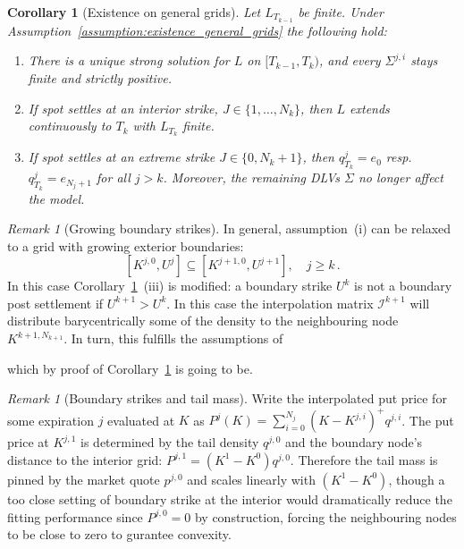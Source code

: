 \documentclass[11pt]{article}
\theoremstyle{plain}
\newtheorem{corollary}[theorem]{Corollary}
\theoremstyle{definition}
\theoremstyle{remark}
\newtheorem{remark}[theorem]{Remark}
\begin{document}
\begin{corollary}[Existence on general grids]
  \label{thm:existence_general_grids}
  Let $L_{T_{k-1}} $ be finite. Under Assumption~\ref{assumption:existence_general_grids} the following hold: 
  \begin{enumerate}[label=(\roman*)]
  \item There is a unique strong solution for $L$ on $[T_{k-1},T_k)$, and every $\Sigma^{j,i}$ stays
    finite and strictly positive.
  \item If spot settles at an interior strike, $ J \in \lbrace 1, \dots, N_k \rbrace $, then $L$ extends continuously to $T_k$
    with $L_{T_k}$ finite.
  \item If spot settles at an extreme strike $ J \in \lbrace 0, N_k +1 \rbrace$, then $q^j_{T_k} = e_0$ resp.\ $q^j_{T_k} = e_{N_j+1}$ for all $j > k$. Moreover, the remaining DLVs $\Sigma$ no longer affect the model. 
\end{enumerate}
\end{corollary}


\begin{remark}[Growing boundary strikes]
  In general, assumption~(i) can be relaxed to a grid with growing exterior boundaries: 
  $$ [K^{j,0}, U^{j}] \subseteq [K^{j+1,0}, U^{j+1}], \quad j \geq k \, . $$
  In this case Corollary~\ref{thm:existence_general_grids}~(iii) is modified: a boundary strike $U^{k}$ is not a boundary post settlement if $U^{k+1} > U^{k}$. In this case the interpolation matrix $\mathcal{I}^{k+1}$ will distribute barycentrically some of the density to the neighbouring node $K^{k+1, N_{k+1}}$. In turn, this fulfills the assumptions of 
  
  which by proof of Corollary~\ref{thm:existence_general_grids} is going to be. 


\end{remark}

\begin{remark}[Boundary strikes and tail mass]
Write the interpolated put price for some expiration $j$ evaluated at $K$ as $P^j(K) = \sum_{i=0}^{N_j} (K - K^{j, i})^+ q^{j, i}$. The put price at $K^{j, 1}$ is determined by the tail density $q^{j, 0}$ and the boundary node's distance to the interior grid: $P^{j, 1} = (K^1 - K^0) q^{j, 0}$. Therefore the tail mass is pinned by the market quote $p^{j,0}$ and scales linearly with $(K^1 - K^0)$, though a too close setting of boundary strike at the interior would dramatically reduce the fitting performance since $P^{j, 0} = 0$ by construction, forcing the neighbouring nodes to be close to zero to gurantee convexity.
\end{remark}
\end{document}
